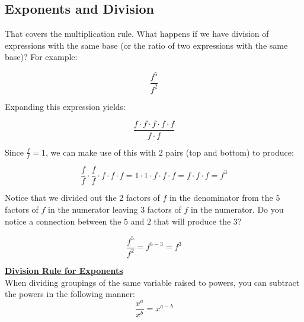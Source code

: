 %
%

\subsection{Exponents and Division}

That covers the multiplication rule. What happens if we have division of expressions with the same base (or the ratio of two expressions with the same base)? For example:

$$\frac{f^5}{f^2}$$

Expanding this expression yields:

$$\frac{f \cdot f \cdot f \cdot f \cdot f}{f \cdot f}$$

Since $\frac{f}{f}=1$, we can make use of this with 2 pairs (top and bottom) to produce:

$$\frac{f}{f} \cdot \frac{f}{f} \cdot f \cdot f \cdot f=1 \cdot 1 \cdot f \cdot f \cdot f=f \cdot f \cdot f=f^3$$

Notice that we divided out the $2$ factors of $f$ in the denominator from the $5$ factors of $f$ in the numerator leaving $3$ factors of $f$ in the numerator. Do you notice a connection between the $5$ and $2$ that will produce the $3$?

$$\frac{f^5}{f^2}=f^{5-3}=f^3$$

\begin{definition}
	\textbf{\underline{Division Rule for Exponents}}\\
	\bigskip
	When dividing groupings of the same variable raised to powers, you can subtract the powers in the following manner:
	$$\frac{x^a}{x^b}=x^{a-b}$$
\end{definition}





